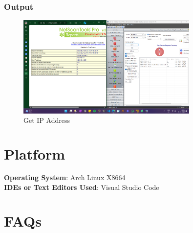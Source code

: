 \documentclass[11pt]{article}
\begin{document}
\subsubsection*{Output}
\begin{figure}[H]
    \centering
    \includegraphics[width=0.8\textwidth]{statdemo (2).png}
    \caption{Get IP Address}
    \label{fig:1}
\end{figure}


\section{Platform}
\textbf{Operating System}: Arch Linux X8664 \\
\textbf{IDEs or Text Editors Used}: Visual Studio Code\\

% 

\section{FAQs}
\end{document}
